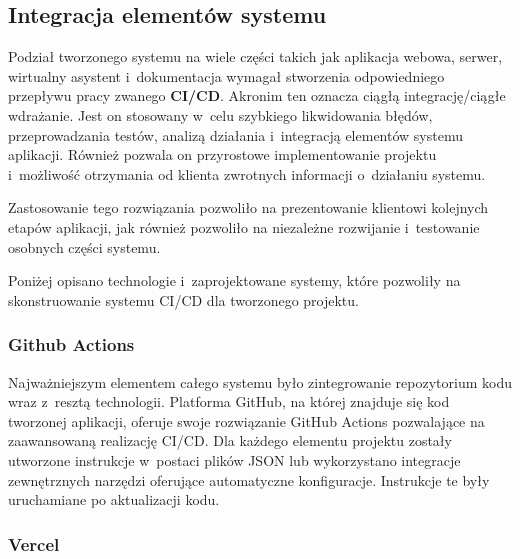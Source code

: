\subsection{Integracja elementów systemu}

Podział tworzonego systemu na wiele części
takich jak aplikacja webowa, serwer, wirtualny asystent
i~dokumentacja wymagał stworzenia odpowiedniego
przepływu pracy zwanego \textbf{CI/CD}. Akronim ten oznacza
ciągłą integrację/ciągłe wdrażanie. Jest on stosowany
w~celu szybkiego likwidowania błędów, przeprowadzania
testów, analizą działania i~integracją elementów systemu
aplikacji. Również pozwala on przyrostowe implementowanie
projektu i~możliwość otrzymania od klienta zwrotnych
informacji o~działaniu systemu.

Zastosowanie tego rozwiązania pozwoliło na
prezentowanie klientowi kolejnych etapów aplikacji, jak
również pozwoliło na niezależne rozwijanie
i~testowanie osobnych części systemu.

Poniżej opisano technologie i~zaprojektowane systemy,
które pozwoliły na skonstruowanie systemu CI/CD dla
tworzonego projektu.


\subsubsection{Github Actions}

Najważniejszym elementem całego systemu było zintegrowanie
repozytorium kodu
wraz z~resztą technologii. Platforma GitHub, na której
znajduje się kod tworzonej aplikacji, oferuje swoje
rozwiązanie GitHub Actions\cite{GithubActions} pozwalające
na zaawansowaną realizację CI/CD. Dla każdego elementu
projektu zostały utworzone instrukcje w~postaci plików JSON
lub wykorzystano integracje zewnętrznych narzędzi oferujące
automatyczne konfiguracje. Instrukcje te były uruchamiane
po aktualizacji kodu.


\subsubsection{Vercel}

